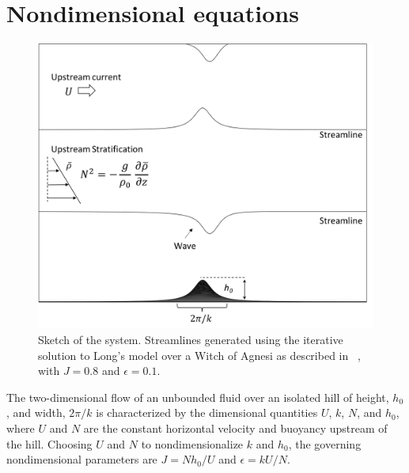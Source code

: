 \documentclass[12pt]{article}
\begin{document}
	
	\section{Nondimensional equations} \label{eq:equations}
	
	\begin{figure}
		\centering
		\includegraphics[width=1\textwidth]{system_sketch.png}
		\caption{Sketch of the system. Streamlines generated using the iterative solution to Long's model over a Witch of Agnesi as described in ~\cite{Laprise1989}, with $J=0.8$ and $\epsilon=0.1$. }
	\end{figure}
	
	The two-dimensional flow of an unbounded fluid over an isolated hill of height, $h_0$, and width, $2\pi/k$ is characterized by the dimensional quantities
	$U$, $k$, $N$, and $h_0$, where $U$ and $N$ are the constant horizontal velocity and buoyancy upstream of the hill. Choosing $U$ and $N$ to nondimensionalize $k$ and $h_0$, the governing
	nondimensional parameters are $J = N h_0/U$ and $\epsilon = k U/N$. 
	
\end{document}
